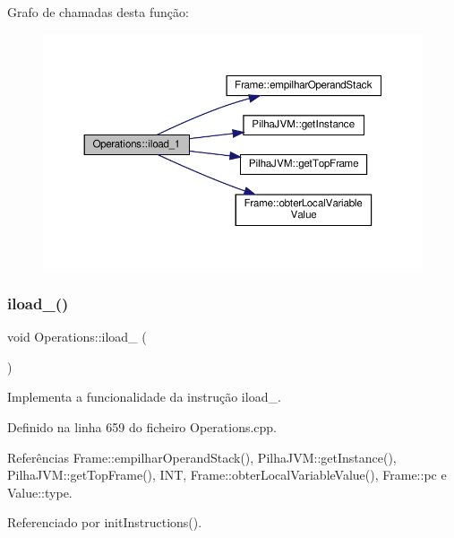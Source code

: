 Grafo de chamadas desta função\+:
\nopagebreak
\begin{figure}[H]
\begin{center}
\leavevmode
\includegraphics[width=350pt]{classOperations_a4b9d8ef21894c0db2203c06712e97765_cgraph}
\end{center}
\end{figure}
\mbox{\label{classOperations_affa5afeadb98117ea0ee66cf2687eb0a}} 
\subsubsection{\texorpdfstring{iload\+\_()}{iload\_2()}}
{\footnotesize\ttfamily void Operations\+::iload\+\_ (\begin{DoxyParamCaption}{ }\end{DoxyParamCaption})\hspace{0.3cm}{\ttfamily [private]}}



Implementa a funcionalidade da instrução iload\+\_. 



Definido na linha 659 do ficheiro Operations.\+cpp.



Referências Frame\+::empilhar\+Operand\+Stack(), Pilha\+J\+V\+M\+::get\+Instance(), Pilha\+J\+V\+M\+::get\+Top\+Frame(), I\+NT, Frame\+::obter\+Local\+Variable\+Value(), Frame\+::pc e Value\+::type.



Referenciado por init\+Instructions().

